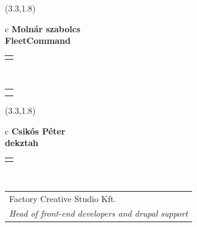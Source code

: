 \documentclass[11pt]{article}
\begin{document}
\makebox(3.3,1.8){
  \renewcommand\arraystretch{1.3}
  \begin{tabular}[c]{c}
    \hspace{8.5mm}
    \LARGE\bf{ Molnár szabolcs }\\
    \hspace{8.5mm}
    \Large{ FleetCommand }\\
    \renewcommand\arraystretch{3}
    \begin{tabular}[c]{c}
      \centering
      \fontfamily{phv}\selectfont{
        \textbf{
          \textsc{
            \scriptsize{
            \color{Dark}{ Ismerkedő }\color{Dark}{ Webmester }\color{Bright}{ Sminkmester }\color{Bright}{ Programozó }
            }
          }
        }
      }
    \end{tabular}
    \\
    \renewcommand\arraystretch{1}
    \begin{tabular}{p{3.3in}}
      \hspace{.7cm}\\
      \hspace{.7cm}\emph{  }\\
    \end{tabular}
  \end{tabular}
}

\makebox(3.3,1.8){
  \renewcommand\arraystretch{1.3}
  \begin{tabular}[c]{c}
    \hspace{8.5mm}
    \LARGE\bf{ Csikós Péter }\\
    \hspace{8.5mm}
    \Large{ dekztah }\\
    \renewcommand\arraystretch{3}
    \begin{tabular}[c]{c}
      \centering
      \fontfamily{phv}\selectfont{
        \textbf{
          \textsc{
            \scriptsize{
            \color{Bright}{ Ismerkedő }\color{Dark}{ Webmester }\color{Dark}{ Sminkmester }\color{Bright}{ Programozó }
            }
          }
        }
      }
    \end{tabular}
    \\
    \renewcommand\arraystretch{1}
    \begin{tabular}{p{3.3in}}
      \hspace{.7cm}Factory Creative Studio Kft.\\
      \hspace{.7cm}\emph{ Head of front-end developers and drupal support }\\
    \end{tabular}
  \end{tabular}
}
\end{document}

